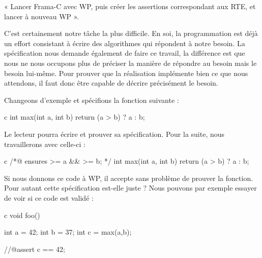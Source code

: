 \documentclass[middle]{zmdocument}
\begin{document}



« Lancer Frama-C avec WP, puis créer les assertions correspondant aux RTE, et 
lancer à nouveau WP ».







C'est certainement notre tâche la plus difficile. En soi, la programmation est
déjà un effort consistant à écrire des algorithmes qui répondent à notre 
besoin. La spécification nous demande également de faire ce travail, la 
différence est que nous ne nous occupons plus de préciser la manière de répondre
au besoin mais le besoin lui-même. Pour prouver que la réalisation implémente 
bien ce que nous attendons, il faut donc être capable de décrire précisément le
besoin.



Changeons d'exemple et spécifions la fonction suivante :



\begin{CodeBlock}{c}
int max(int a, int b){
  return (a > b) ? a : b;
}
\end{CodeBlock}



Le lecteur pourra écrire et prouver sa spécification. Pour la suite, nous 
travaillerons avec celle-ci :



\begin{CodeBlock}{c}
/*@
  ensures \result >= a && \result >= b;
*/
int max(int a, int b){
  return (a > b) ? a : b;
}
\end{CodeBlock}



Si nous donnons ce code à WP, il accepte sans problème de prouver la fonction. 
Pour autant cette spécification est-elle juste ? Nous pouvons par exemple 
essayer de voir si ce code est validé :



\begin{CodeBlock}{c}
void foo(){
  int a = 42;
  int b = 37;
  int c = max(a,b);

  //@assert c == 42;
}
\end{CodeBlock}
\end{document}

